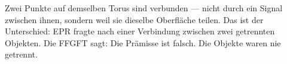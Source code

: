 \begin{laierspur}
Zwei Punkte auf demselben Torus sind verbunden --- nicht durch ein
Signal zwischen ihnen, sondern weil sie dieselbe Oberfläche teilen. Das
ist der Unterschied: EPR fragte nach einer Verbindung zwischen zwei
getrennten Objekten. Die FFGFT sagt: Die Prämisse ist falsch. Die
Objekte waren nie getrennt.
\end{laierspur}

